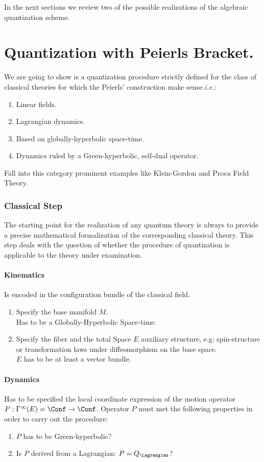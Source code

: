 \documentclass[Main]{subfiles}
\begin{document}
In the next sections we review two of the possible realizations of the algebraic quantization scheme.

\section{Quantization with Peierls Bracket.}
	We are going to show is a quantization procedure strictly defined for the class of classical theories for which the Peierls' construction make sense.\textit{i.e.}:
	\begin{enumerate}
		\item Linear fields.
		\item Lagrangian dynamics.
		\item Based on globally-hyperbolic space-time.
		\item Dynamics ruled by a Green-hyperbolic, self-dual operator.	
	\end{enumerate}
	Fall into this category prominent examples like Klein-Gordon and Proca Field Theory\cite{Benini}.

	\subsubsection{Classical Step}%
	The starting point for the realization of any quantum theory is always to provide a precise mathematical formalization of the corresponding classical theory.
	This step deals with the question of whether the procedure of quantization is applicable to the theory under examination.
	
		\paragraph{Kinematics}
		Is encoded in the configuration bundle of the classical field.
   					\begin{enumerate}
   						\item Specify the base manifold $M$. \\Has to be a Globally-Hyperbolic Space-time.
   						\item\label{Step:AuxiliaryStructure} Specify the fiber and the total Space $E$ auxiliary structure, e.g: spin-structure or transformation laws under diffeomorphism on the base space.\\$E$ has to be at least a vector bundle.
   					\end{enumerate}
   		
   		\paragraph{Dynamics}
   		Has to be specified the local coordinate expression of the motion operator $P: \Gamma^\infty (E)= \Conf \rightarrow \Conf$.
   		Operator $P$ must met the following properties in order to carry out the procedure:
   				   	\begin{enumerate}
   						\item $P$ has to be Green-hyperbolic?
   						\item Is $P$ derived from a Lagrangian: $P=Q_\Lagrangian$? 
   					\end{enumerate}
   					
\end{document}
